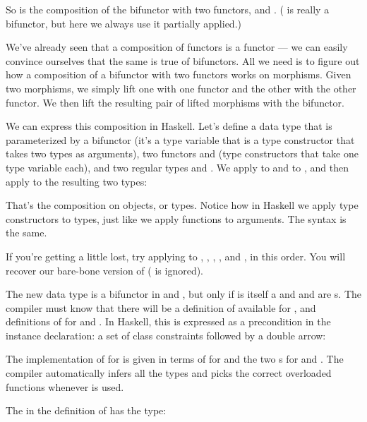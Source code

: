 So  is the composition of the bifunctor 
with two functors,  and .
( is really a bifunctor, but here we always use it
partially applied.)

We've already seen that a composition of functors is a functor --- we
can easily convince ourselves that the same is true of bifunctors. All
we need is to figure out how a composition of a bifunctor with two
functors works on morphisms. Given two morphisms, we simply lift one
with one functor and the other with the other functor. We then lift the
resulting pair of lifted morphisms with the bifunctor.

We can express this composition in Haskell. Let's define a data type
that is parameterized by a bifunctor  (it's a type variable
that is a type constructor that takes two types as arguments), two
functors  and  (type constructors that take one
type variable each), and two regular types  and . We
apply  to  and  to , and then
apply  to the resulting two types:

That's the composition on objects, or types. Notice how in Haskell we
apply type constructors to types, just like we apply functions to
arguments. The syntax is the same.

If you're getting a little lost, try applying  to
, , , , and
, in this order. You will recover our bare-bone version of
 ( is ignored).

The new data type  is a bifunctor in  and
, but only if  is itself a  and
 and  are s. The compiler must
know that there will be a definition of  available for
, and definitions of  for  and
. In Haskell, this is expressed as a precondition in the
instance declaration: a set of class constraints followed by a double
arrow:

The implementation of  for  is given in
terms of  for  and the two s for
 and . The compiler automatically infers all the
types and picks the correct overloaded functions whenever
 is used.

The  in the definition of  has the type:

